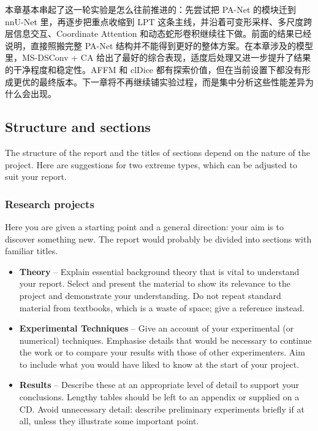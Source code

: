 \documentclass[a4paper,12pt]{article}
\begin{document}
本章基本串起了这一轮实验是怎么往前推进的：先尝试把 PA-Net 的模块迁到 nnU-Net 里，再逐步把重点收缩到 LPT 这条主线，并沿着可变形采样、多尺度跨层信息交互、Coordinate Attention 和动态蛇形卷积继续往下做。前面的结果已经说明，直接照搬完整 PA-Net 结构并不能得到更好的整体方案。在本章涉及的模型里，MS-DSConv + CA 给出了最好的综合表现，适度后处理又进一步提升了结果的干净程度和稳定性。AFFM 和 clDice 都有探索价值，但在当前设置下都没有形成更优的最终版本。下一章将不再继续铺实验过程，而是集中分析这些性能差异为什么会出现。

\subsection{Structure and sections}

The structure of the report and the titles of sections depend on the nature of the project. Here are suggestions for two extreme types, which can be adjusted to suit your report.

\subsubsection{Research projects}

Here you are given a starting point and a general direction: your aim is to discover something new. The report would probably be divided into sections with familiar titles.
\begin{itemize}
\item
\textbf{Theory} -- 
Explain essential background theory that is vital to understand your report. Select and present the material to show its relevance to the project and demonstrate your understanding. Do not repeat standard material from textbooks, which is a waste of space; give a reference instead. 

\item
\textbf{Experimental Techniques} --
Give an account of your experimental (or numerical) techniques. Emphasise details that would be necessary to continue the work or to compare your results with those of other experimenters. Aim to include what you would have liked to know at the start of your project.

\item
\textbf{Results} --
Describe these at an appropriate level of detail to support your conclusions. Lengthy tables should be left to an appendix or supplied on a CD. Avoid unnecessary detail: describe preliminary experiments briefly if at all, unless they illustrate some important point.
\end{itemize}
\end{document}
